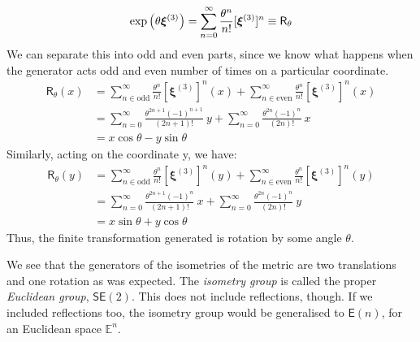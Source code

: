 \begin{itemize}[label=$\triangleright$]
\begin{align*}
  \exp\qty(\theta \boldsymbol{\xi}^{(3)}) = \sum\limits_{n=0}^\infty \frac{\theta^n}{n!}[\boldsymbol{\xi}^{(3)}]^n \equiv \mathsf{R}_\theta
\end{align*}
We can separate this into odd and even parts, since we know what happens when the generator acts odd and even number of times on a particular coordinate. 
\begin{align*}
  \mathsf{R}_\theta (x) &= \sum\limits_{n\in  \mathrm{odd}}^\infty \frac{\theta^n}{n!}[\boldsymbol{\xi}^{(3)}]^n(x) +\sum\limits_{n\in\mathrm{even}}^\infty \frac{\theta^n}{n!}[\boldsymbol{\xi}^{(3)}]^n(x)\\
  &=\sum\limits_{n=0}^\infty \frac{\theta^{2n+1}(-1)^{n+1}}{(2n+1)!}\ y+\sum\limits_{n=0}^\infty \frac{\theta^{2n}(-1)^n}{(2n)!}\ x\\
  &=x\cos\theta-y\sin\theta
\end{align*}
Similarly, acting on the coordinate y, we have:
\begin{align*}
  \mathsf{R}_\theta (y) &= \sum\limits_{n\in  \mathrm{odd}}^\infty \frac{\theta^n}{n!}[\boldsymbol{\xi}^{(3)}]^n(y) +\sum\limits_{n\in\mathrm{even}}^\infty \frac{\theta^n}{n!}[\boldsymbol{\xi}^{(3)}]^n(y)\\
  &=\sum\limits_{n=0}^\infty \frac{\theta^{2n+1}(-1)^n}{(2n+1)!}\ x+\sum\limits_{n=0}^\infty \frac{\theta^{2n}(-1)^n}{(2n)!}\ y\\
  &=x\sin\theta+y\cos\theta
\end{align*}
Thus, the finite transformation generated is rotation by some angle $\theta$. 
\end{itemize}
We see that the generators of the isometries of the metric are two translations and one rotation as was expected. The \textit{isometry group} is called the proper \textit{Euclidean group}, $\mathsf{SE}(2)$. This does not include reflections, though. If we included reflections too, the isometry group would be generalised to $\mathsf{E}(n)$, for an Euclidean space $\mathbb{E}^n$.